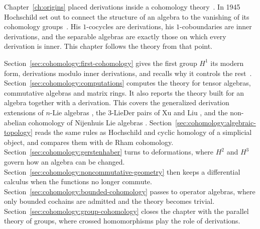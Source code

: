 Chapter~\ref{ch:origins} placed derivations inside a cohomology theory~\cite[p.~58]{Hochschild1945}. In 1945 Hochschild
set out to connect the structure of an algebra to the vanishing of its cohomology
groups~\cite[p.~58]{Hochschild1945}. His $1$-cocycles are derivations, his
$1$-coboundaries are inner derivations, and the separable algebras are exactly those
on which every derivation is inner. This chapter follows the theory from that point.

Section~\ref{sec:cohomology:first-cohomology} gives the first group $H^1$ its
modern form, derivations modulo inner derivations, and recalls why it controls
the rest~\cite[Theorem~3.4, p.~9]{Das2025Nijenhuis}. Section~\ref{sec:cohomology:computations} computes the theory for
tensor algebras, commutative algebras and matrix rings. It also reports the
theory built for an algebra together with a derivation. This covers the
generalized derivation extensions of $n$-Lie algebras \cite[Proposition~2.13,
pp.~25--26]{AtesliEsenSutlu2021}, the $3$-LieDer pairs of Xu and Liu
\cite[p.~1]{XuLiu2021ThreeLieDer}, and the non-abelian cohomology of Nijenhuis
Lie algebras \cite[Theorem~3.4, p.~9]{Das2025Nijenhuis}.
Section~\ref{sec:cohomology:algebraic-topology} reads the same rules as
Hochschild and cyclic homology of a simplicial object, and compares them with
de Rham cohomology. Section~\ref{sec:cohomology:gerstenhaber} turns to
deformations, where $H^2$ and $H^3$ govern how an algebra can be changed.
Section~\ref{sec:cohomology:noncommutative-geometry} then keeps a differential
calculus when the functions no longer commute.
Section~\ref{sec:cohomology:bounded-cohomology} passes to operator algebras,
where only bounded cochains are admitted and the theory becomes trivial.
Section~\ref{sec:cohomology:group-cohomology} closes the chapter with the
parallel theory of groups, where crossed homomorphisms play the role of
derivations.

